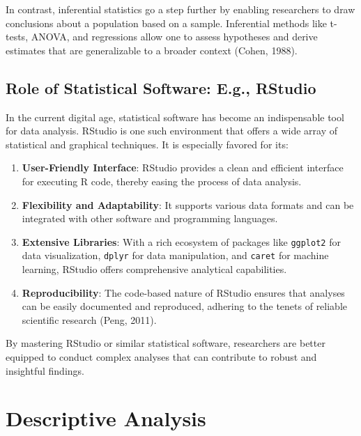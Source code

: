 \documentclass[
  b5paper]{book}
\providecommand{\tightlist}{%
  \setlength{\itemsep}{0pt}\setlength{\parskip}{0pt}}
\begin{document}
In contrast, inferential statistics go a step further by enabling researchers to draw conclusions about a population based on a sample. Inferential methods like t-tests, ANOVA, and regressions allow one to assess hypotheses and derive estimates that are generalizable to a broader context (Cohen, 1988).

\hypertarget{role-of-statistical-software-e.g.-rstudio}{%
\subsection*{Role of Statistical Software: E.g., RStudio}\label{role-of-statistical-software-e.g.-rstudio}}

In the current digital age, statistical software has become an indispensable tool for data analysis. RStudio is one such environment that offers a wide array of statistical and graphical techniques. It is especially favored for its:

\begin{enumerate}
\def\labelenumi{\arabic{enumi}.}
\tightlist
\item
  \textbf{User-Friendly Interface}: RStudio provides a clean and efficient interface for executing R code, thereby easing the process of data analysis.
\item
  \textbf{Flexibility and Adaptability}: It supports various data formats and can be integrated with other software and programming languages.
\item
  \textbf{Extensive Libraries}: With a rich ecosystem of packages like \texttt{ggplot2} for data visualization, \texttt{dplyr} for data manipulation, and \texttt{caret} for machine learning, RStudio offers comprehensive analytical capabilities.
\item
  \textbf{Reproducibility}: The code-based nature of RStudio ensures that analyses can be easily documented and reproduced, adhering to the tenets of reliable scientific research (Peng, 2011).
\end{enumerate}

By mastering RStudio or similar statistical software, researchers are better equipped to conduct complex analyses that can contribute to robust and insightful findings.

\hypertarget{descriptive-analysis-1}{%
\section{Descriptive Analysis}\label{descriptive-analysis-1}}
\end{document}
